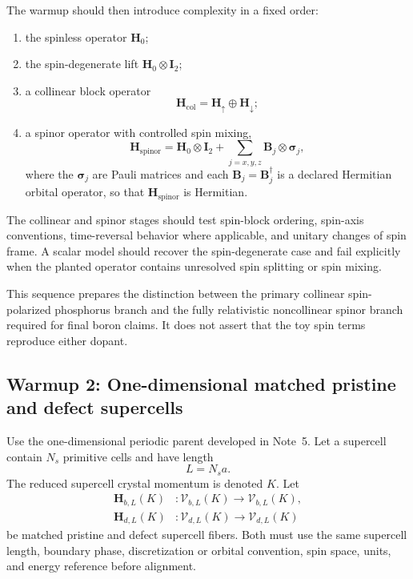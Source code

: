 The warmup should then introduce complexity in a fixed order:
\begin{enumerate}
    \item the spinless operator $\mathbf H_0$;
    \item the spin-degenerate lift $\mathbf H_0\otimes\mathbf I_2$;
    \item a collinear block operator
          \begin{equation}
              \mathbf H_{\mathrm{col}}
              =
              \mathbf H_{\uparrow}
              \oplus
              \mathbf H_{\downarrow};
          \end{equation}
    \item a spinor operator with controlled spin mixing,
          \begin{equation}
              \mathbf H_{\mathrm{spinor}}
              =
              \mathbf H_0\otimes\mathbf I_2
              +
              \sum_{j=x,y,z}
              \mathbf B_j\otimes\boldsymbol\sigma_j,
          \end{equation}
          where the $\boldsymbol\sigma_j$ are Pauli matrices and each
          $\mathbf B_j=\mathbf B_j^\dagger$ is a declared Hermitian orbital
          operator, so that $\mathbf H_{\mathrm{spinor}}$ is Hermitian.
\end{enumerate}
The collinear and spinor stages should test spin-block ordering, spin-axis
conventions, time-reversal behavior where applicable, and unitary changes of
spin frame. A scalar model should recover the spin-degenerate case and fail
explicitly when the planted operator contains unresolved spin splitting or
spin mixing.

This sequence prepares the distinction between the primary collinear
spin-polarized phosphorus branch and the fully relativistic noncollinear spinor
branch required for final boron claims. It does not assert that the toy spin
terms reproduce either dopant.

\subsection*{Warmup 2: One-dimensional matched pristine and defect supercells}

Use the one-dimensional periodic parent developed in Note~5. Let a supercell
contain $N_s$ primitive cells and have length
\begin{equation}
    L=N_sa.
\end{equation}
The reduced supercell crystal momentum is denoted $K$. Let
\begin{align}
    \mathbf H_{b,L}(K)
    &: \mathcal V_{b,L}(K)
    \longrightarrow
    \mathcal V_{b,L}(K),
    \\
    \mathbf H_{d,L}(K)
    &: \mathcal V_{d,L}(K)
    \longrightarrow
    \mathcal V_{d,L}(K)
\end{align}
be matched pristine and defect supercell fibers. Both must use the same
supercell length, boundary phase, discretization or orbital convention, spin
space, units, and energy reference before alignment.

